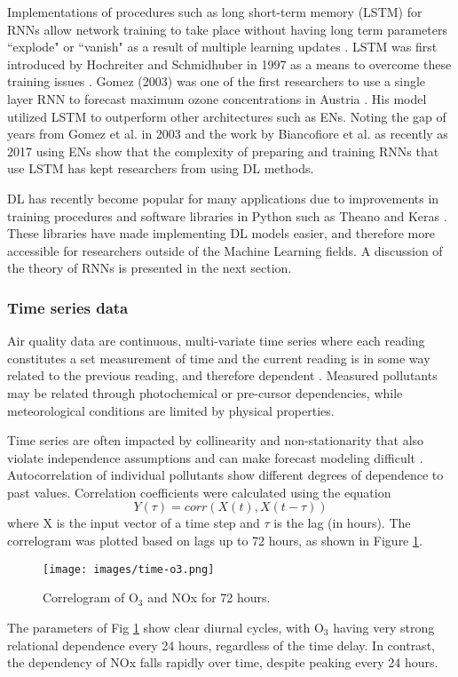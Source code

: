 Implementations of procedures such as long short-term memory (LSTM) for RNNs allow network training to take place without having long term parameters ``explode" or ``vanish" as a result of multiple learning updates \citep{Pascanu2013}. LSTM was first introduced by Hochreiter and Schmidhuber in 1997 as a means to overcome these training issues \citep{Hochreiter1997}. Gomez (2003) was one of the first researchers to use a single layer RNN to forecast maximum ozone concentrations in Austria \citep{Gomez2003}. His model utilized LSTM to outperform other architectures such as ENs. Noting the gap of years from Gomez et al. in 2003 and the work by Biancofiore et al. as recently as 2017 using ENs show that the complexity of preparing and training RNNs that use LSTM has kept researchers from using DL methods.

DL has recently become popular for many applications due to improvements in training procedures and software libraries in Python such as Theano \citep{Theano2016} and Keras \citep{keras2015}. These libraries have made implementing DL models easier, and therefore more accessible for researchers outside of the Machine Learning fields. A discussion of the theory of RNNs is presented in the next section.

\subsubsection{Time series data}
Air quality data are continuous, multi-variate time series where each reading constitutes a set measurement of time and the current reading is in some way related to the previous reading, and therefore dependent \citep{Gheyas2011}. Measured pollutants may be related through photochemical or pre-cursor dependencies, while meteorological conditions are limited by physical properties. 

Time series are often impacted by collinearity and non-stationarity that also violate independence assumptions and can make forecast modeling difficult \citep{Gheyas2011}. Autocorrelation of individual pollutants show different degrees of dependence to past values.  Correlation coefficients were calculated using the equation
%
\begin{equation}
\label{eq:corr}
Y(\tau)= corr(X(t),X(t - \tau))
\end{equation}
%
\noindent
where X is the input vector of a time step and $\tau$ is the lag (in hours). The correlogram was plotted based on lags up to 72 hours, as shown in Figure \ref{fig:serialcorr}.
%
\begin{figure}
\centering
\texttt{[image: images/time-o3.png]}  %
\caption{Correlogram of O$_{3}$ and NOx for 72 hours.}
\label{fig:serialcorr}
\end{figure}
%
The parameters of Fig \ref{fig:serialcorr} show clear diurnal cycles, with O$_{3}$ having very strong relational dependence every 24 hours, regardless of the time delay. In contrast, the dependency of NOx falls rapidly over time, despite peaking every 24 hours. 

